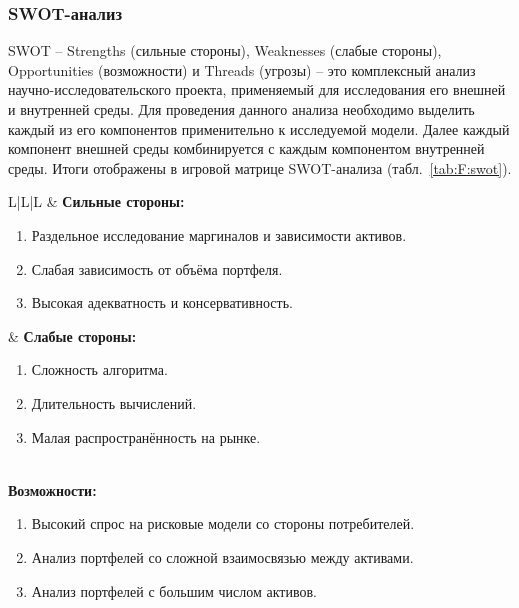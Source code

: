 \subsubsection{SWOT-анализ}

SWOT -- Strengths (сильные стороны), Weaknesses (слабые стороны), Opportunities (возможности) и Threads (угрозы) -- это комплексный анализ научно-исследовательского проекта, применяемый для исследования его внешней и внутренней среды.
Для проведения данного анализа необходимо выделить каждый из его компонентов применительно к исследуемой модели. 
Далее каждый компонент внешней среды комбинируется с каждым компонентом внутренней среды. 
Итоги отображены в игровой матрице SWOT-анализа (табл.~\ref{tab:F:swot}).

\begin{table}[hbt!]
\caption{SWOT-анализ}
\label{tab:F:swot}
\centering
\small
\renewcommand\tabularxcolumn[1]{p{#1}}
\begin{tabularx}{\textwidth}
{L|L|L} \toprule
    & \textbf{Сильные стороны:}
    \begin{enumerate}[wide=0pt,labelsep=4pt,after=\vspace{-\baselineskip}]
        \item Раздельное исследование маргиналов и зависимости активов.
        \item Слабая зависимость от объёма портфеля.
        \item Высокая адекватность и консервативность.
    \end{enumerate} & \textbf{Слабые стороны:}
    \begin{enumerate}[wide=0pt,labelsep=4pt,after=\vspace{-\baselineskip}]
        \item Сложность алгоритма.
        \item Длительность вычислений.
        \item Малая распространённость на рынке.
    \end{enumerate} \\
    \midrule
    \textbf{Возможности:}
    \begin{enumerate}[wide=0pt,labelsep=4pt,after=\vspace{-\baselineskip}]
        \item Высокий спрос на рисковые модели со стороны потребителей.
        \item Анализ портфелей со сложной взаимосвязью между активами.
        \item Анализ портфелей с большим числом активов.

\end{enumerate}
\end{tabularx}
\end{table}
